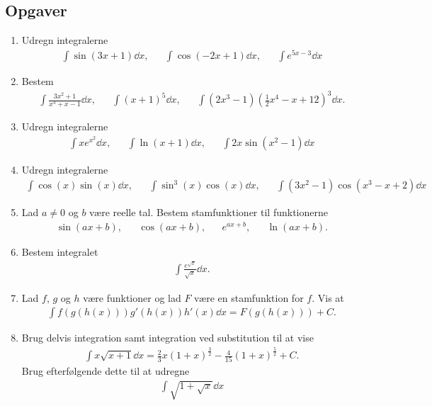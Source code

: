 \subsection{Opgaver}


\begin{enumerate}
	\item Udregn integralerne
	\begin{align*}
	\int \sin(3x+1) \dd x,&& \int \cos(-2x+1) \dd x, && \int e^{5x-3} \dd x
	\end{align*}
	
	\item Bestem
	\begin{align*}
	\int \frac{3x^2+1}{x^3+x-1}\dd x,&& \int (x+1)^5\dd x,&& \int(2x^3-1)(\frac{1}{2}x^4-x+12)^3\dd x.
	\end{align*}
	
		
	\item Udregn integralerne
	\begin{align*}
	\int xe^{x^2} \dd x, && \int \ln(x+1) \dd x,&& \int 2x\sin(x^2-1)\dd x
	\end{align*}
	

	
	\item Udregn integralerne
	\begin{align*}
	\int \cos(x)\sin(x) \dd x,&& \int \sin^3(x)\cos(x) \dd x,&& \int (3x^2-1)\cos(x^3-x+2) \dd x
	\end{align*}
	
	\item Lad $a\neq 0$ og $b$ være reelle tal. Bestem stamfunktioner til funktionerne
	\begin{align*}
	\sin(ax+b),&& \cos(ax+b),&& e^{ax+b},&&\ln(ax+b).
	\end{align*}
	
	\item Bestem integralet
	\begin{align*}
	\int \frac{e^{\sqrt{x}}}{\sqrt{x}} \dd x.
	\end{align*}


	\item Lad $f$, $g$ og $h$ være funktioner og lad $F$ være en stamfunktion for $f$. Vis at 
	\begin{align*}
	\int f(g(h(x)))g'(h(x)) h'(x)\dd x=F(g(h(x))) +C.
	\end{align*}
	
	\item Brug delvis integration samt integration ved substitution til at vise 
	\begin{align*}
	\int x\sqrt{x+1}\dd x=\frac{2}{3}x(1+x)^{\frac{3}{2}}-\frac{4}{15}(1+x)^{\frac{5}{2}}+C.
	\end{align*}
	Brug efterfølgende dette til at udregne
	\begin{align*}
	\int \sqrt{1+\sqrt{x}} \dd x
	\end{align*}
	

\end{enumerate}
